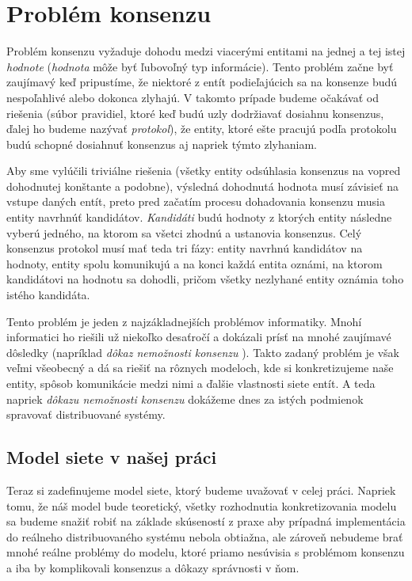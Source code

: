 \chapter{Problém konsenzu}

Problém konsenzu vyžaduje dohodu medzi viacerými entitami na jednej a tej
istej \textit{hodnote} (\textit{hodnota} môže byť ľubovoľný typ informácie).
Tento problém začne byť zaujímavý keď pripustíme, že niektoré z entít
podieľajúcich sa na konsenze budú nespoľahlivé alebo dokonca zlyhajú. V takomto
prípade budeme očakávať od riešenia (súbor pravidiel, ktoré keď budú uzly dodržiavať
dosiahnu konsenzus, ďalej ho budeme nazývať \textit{protokol}),
že entity, ktoré ešte pracujú podľa protokolu budú schopné dosiahnuť konsenzus
aj napriek týmto zlyhaniam.

Aby sme vylúčili triviálne riešenia (všetky entity odsúhlasia konsenzus na vopred 
dohodnutej konštante a podobne), výsledná dohodnutá hodnota musí závisieť na vstupe
daných entít, preto pred začatím procesu dohadovania konsenzu
musia entity navrhnúť kandidátov. \textit{Kandidáti} budú hodnoty
z ktorých entity následne vyberú jedného, na ktorom sa všetci zhodnú a ustanovia
konsenzus.
Celý konsenzus protokol musí mať teda tri fázy: entity navrhnú kandidátov na hodnoty,
entity spolu komunikujú a na konci každá entita oznámi, na ktorom kandidátovi
na hodnotu sa dohodli, pričom všetky nezlyhané entity oznámia toho istého kandidáta.

Tento problém je jeden z najzákladnejších problémov informatiky.
Mnohí informatici ho riešili už niekoľko desaťročí a dokázali prísť
na mnohé zaujímavé dôsledky (napríklad \textit{dôkaz nemožnosti konsenzu}
\cite{fischer1982impossibility}). Takto zadaný problém je však veľmi všeobecný
a dá sa riešiť na rôznych modeloch, kde si konkretizujeme naše entity, spôsob
komunikácie medzi nimi a ďalšie vlastnosti siete entít. A teda napriek
\textit{dôkazu nemožnosti konsenzu} \cite{fischer1982impossibility} dokážeme dnes
za istých podmienok spravovať distribuované systémy.

\section {Model siete v našej práci}

Teraz si zadefinujeme model siete, ktorý budeme uvažovať v celej práci.
Napriek tomu, že náš model bude teoretický, všetky rozhodnutia konkretizovania
modelu sa budeme snažiť robiť na základe skúseností z praxe aby prípadná
implementácia do reálneho distribuovaného systému nebola obtiažna, ale zároveň
nebudeme brať mnohé reálne problémy do modelu, ktoré priamo nesúvisia s
problémom konsenzu a iba by komplikovali konsenzus a dôkazy správnosti v ňom.


